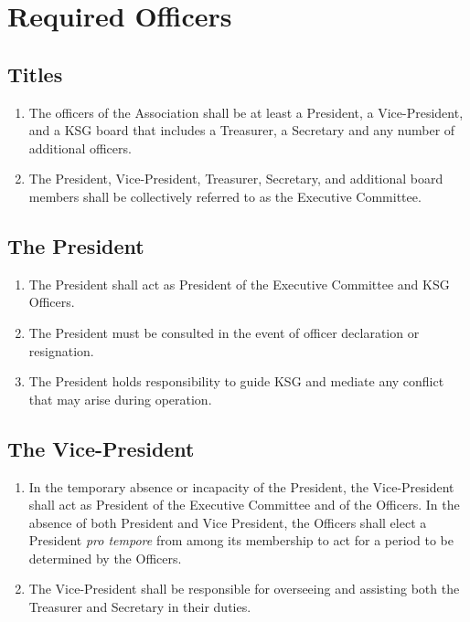 \documentclass[12pt,letterpaper]{article}
\begin{document}
\section{Required Officers}

\subsection{Titles}
\begin{enumerate}
  \item The officers of the Association shall be at least a President, a
        Vice-President, and a KSG board that includes a Treasurer, a Secretary
        and any number of additional officers.
  \item The President, Vice-President, Treasurer, Secretary, and additional
        board members shall be collectively referred to as the Executive Committee.
\end{enumerate}

\subsection{The President}
\begin{enumerate}
  \item The President shall act as President of the Executive Committee and KSG
        Officers.
  \item The President must be consulted in the event of officer declaration
        or resignation.
  \item The President holds responsibility to guide KSG and mediate any conflict
        that may arise during operation.
\end{enumerate}

\subsection{The Vice-President}
\begin{enumerate}
  \item In the temporary absence or incapacity of the President, the Vice-President
        shall act as President of the Executive Committee and of the Officers.
        In the absence of both President and Vice President, the Officers shall elect
        a President \textit{pro tempore} from among its membership to act for a
        period to be determined by the Officers.
  \item The Vice-President shall be responsible for overseeing and assisting both the
        Treasurer and Secretary in their duties.
\end{enumerate}
\end{document}
